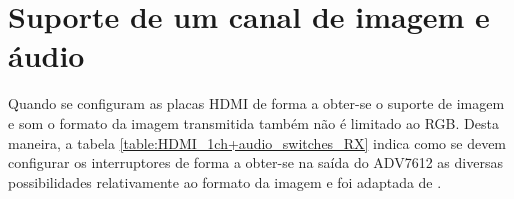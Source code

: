 \section{Suporte de um canal de imagem e áudio} \label {subsubsec:HDMIconfig+audio_switches}

Quando se configuram as placas HDMI de forma a obter-se o suporte de imagem e som o formato da imagem transmitida também não é limitado ao RGB. Desta maneira, a tabela \ref{table:HDMI_1ch+audio_switches_RX} indica como se devem configurar os interruptores de forma a obter-se na saída do ADV7612 as diversas possibilidades relativamente ao formato da imagem e foi adaptada de \cite{R014}.

